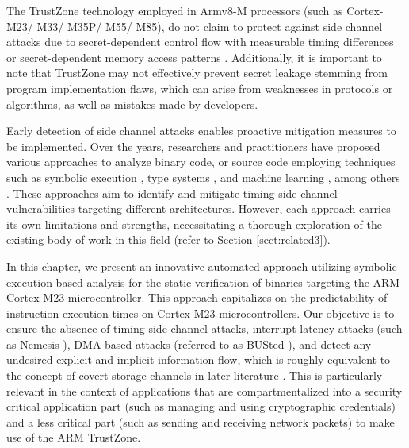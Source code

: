 The TrustZone technology employed in Armv8-M processors (such as
Cortex-M23/ M33/ M35P/ M55/ M85), do not claim to protect against side
channel attacks due to secret-dependent control flow with measurable timing
differences or secret-dependent memory access patterns \cite{armdeveloper}.
Additionally, it is important to note that TrustZone may not effectively
prevent secret leakage stemming from program implementation flaws, which
can arise from weaknesses in protocols or algorithms, as well as mistakes
made by developers. 


Early detection of side channel attacks enables proactive mitigation
measures to be implemented. Over the years, researchers and practitioners
have proposed various approaches to analyze binary code, or source code
employing techniques such as symbolic execution \cite{binsec, pitchfork},
type systems \cite{scfmsp, MantelAVR, Agat, barthe2014system}, and machine
learning \cite{MLforSC}, among others \cite{timingattack}. These approaches
aim to identify and mitigate timing side channel vulnerabilities targeting
different architectures. However, each approach carries its own limitations
and strengths, necessitating a thorough exploration of the existing body of
work in this field (refer to Section \ref{sect:related3}).

In this chapter, we present an innovative automated approach utilizing symbolic execution-based analysis for the static verification of binaries targeting the ARM Cortex-M23 microcontroller. This approach capitalizes on the predictability of instruction execution times on Cortex-M23 microcontrollers. Our objective is to ensure the absence of timing side channel attacks, interrupt-latency attacks (such as Nemesis \cite{Nemesis}), DMA-based attacks (referred to as BUSted \cite{busted}), and detect any undesired explicit and implicit information flow, which is roughly equivalent to the concept of covert storage channels in later literature \cite{storagechannel}. This is particularly relevant in the context of applications that are compartmentalized into a security critical application part (such as managing and using cryptographic credentials) and a less critical part (such as sending and receiving network packets) to make use of the ARM TrustZone. 


